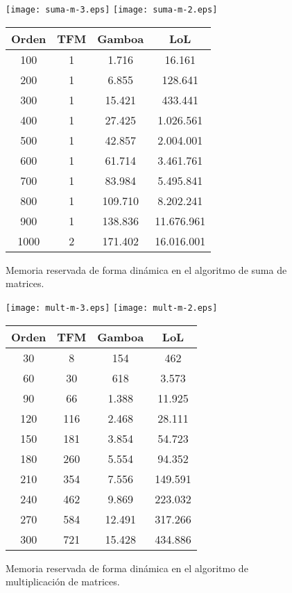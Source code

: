 \documentclass[a4paper,10pt]{article}
\begin{document}
\newpage
\begin{figure}[H]
\begin{center}
	\texttt{[image: suma-m-3.eps]}	
	\texttt{[image: suma-m-2.eps]}	
\begin{tabular}{||c|c|c|c||}
\hline
\textbf{Orden} & \textbf{TFM} & \textbf{Gamboa} & \textbf{LoL} \\
\hline
100 &	1 &	1.716 &	16.161 \\
200 &	1 &	6.855 &	128.641 \\
300 &	1 &	15.421 &	433.441 \\
400 &	1 &	27.425 &	1.026.561 \\
500 &	1 &	42.857 &	2.004.001 \\
600 &	1 &	61.714 &	3.461.761 \\
700 &	1 &	83.984 &	5.495.841 \\
800 &	1 &	109.710 &	8.202.241 \\
900 &	1 &	138.836 & 11.676.961 \\
1000 & 2 & 171.402 &	16.016.001 \\
\hline
\end{tabular}
\end{center}
\caption{Memoria reservada de forma dinámica en el algoritmo de suma de matrices.}
\end{figure}

\newpage
\begin{figure}[H]
\begin{center}
	\texttt{[image: mult-m-3.eps]}	
	\texttt{[image: mult-m-2.eps]}	
\begin{tabular}{||c|c|c|c||}
\hline
\textbf{Orden} & \textbf{TFM} & \textbf{Gamboa} & \textbf{LoL} \\
\hline
30 &	8 &	154 &	462 \\
60 &	30 &	618 &	3.573 \\
90 &	66 &	1.388 &	11.925 \\
120 &	116 &	2.468	 & 28.111 \\
150 &	181 &	3.854 &	54.723 \\
180 &	260 &	5.554 &	94.352 \\
210 &	354 &	7.556 &	149.591 \\
240 &	462 &	9.869 &	223.032 \\
270 &	584 &	12.491 &	317.266 \\
300 &	721 &	15.428 &	434.886 \\
\hline
\end{tabular}
\end{center}
\caption{Memoria reservada de forma dinámica en el algoritmo de multiplicación de matrices.}
\end{figure}
\end{document}
